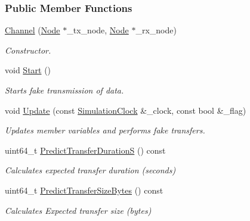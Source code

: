 \subsubsection*{Public Member Functions}
\begin{DoxyCompactItemize}
\item 
\hyperlink{classosse_1_1collaborate_1_1_channel_a2f160167f6144d6c2c6d91639b003e47}{Channel} (\hyperlink{classosse_1_1collaborate_1_1_node}{Node} $\ast$\+\_\+tx\+\_\+node, \hyperlink{classosse_1_1collaborate_1_1_node}{Node} $\ast$\+\_\+rx\+\_\+node)
\begin{DoxyCompactList}\small\item\em Constructor. \end{DoxyCompactList}\item 
\mbox{\label{classosse_1_1collaborate_1_1_channel_ab8e91e0798d0a4270669b3bffd7bf0a4}} 
void \hyperlink{classosse_1_1collaborate_1_1_channel_ab8e91e0798d0a4270669b3bffd7bf0a4}{Start} ()
\begin{DoxyCompactList}\small\item\em Starts fake transmission of data. \end{DoxyCompactList}\item 
void \hyperlink{classosse_1_1collaborate_1_1_channel_adf7ff16e5dcde4bd51ef2e602568d4eb}{Update} (const \hyperlink{classosse_1_1collaborate_1_1_simulation_clock}{Simulation\+Clock} \&\+\_\+clock, const bool \&\+\_\+flag)
\begin{DoxyCompactList}\small\item\em Updates member variables and performs fake transfers. \end{DoxyCompactList}\item 
uint64\+\_\+t \hyperlink{classosse_1_1collaborate_1_1_channel_a44c51b493f2c32e35fbc2104168dd98d}{Predict\+Transfer\+DurationS} () const
\begin{DoxyCompactList}\small\item\em Calculates expected transfer duration (seconds) \end{DoxyCompactList}\item 
uint64\+\_\+t \hyperlink{classosse_1_1collaborate_1_1_channel_a325a93527ae5a31ae54142c0e4d684ca}{Predict\+Transfer\+Size\+Bytes} () const
\begin{DoxyCompactList}\small\item\em Calculates Expected transfer size (bytes) \end{DoxyCompactList}\item 

\end{DoxyCompactItemize}
